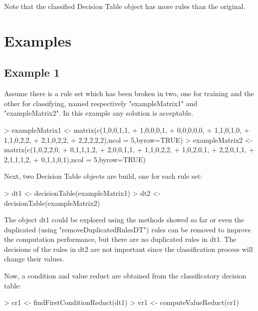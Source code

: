 \documentclass[a4paper]{article}
\begin{document}
Note that the classified Decision Table object has more rules than the original.



\section{Examples}

\subsection{Example 1}

Assume there is a rule set which has been broken in two, one for training and the other for classifying, named respectively "exampleMatrix1" and "exampleMatrix2". In this example any solution is acceptable.

\begin{Schunk}
\begin{Sinput}
> exampleMatrix1 <- matrix(c(1,0,0,1,1,
+ 1,0,0,0,1,
+ 0,0,0,0,0,
+ 1,1,0,1,0,
+ 1,1,0,2,2,
+ 2,1,0,2,2,
+ 2,2,2,2,2),ncol = 5,byrow=TRUE)
> exampleMatrix2 <- matrix(c(1,0,2,2,0,
+ 0,1,1,1,2,
+ 2,0,0,1,1,
+ 1,1,0,2,2,
+ 1,0,2,0,1,
+ 2,2,0,1,1,
+ 2,1,1,1,2,
+ 0,1,1,0,1),ncol = 5,byrow=TRUE)
\end{Sinput}
\end{Schunk}

Next, two Decision Table objects are build, one for each rule set:

\begin{Schunk}
\begin{Sinput}
> dt1 <- decisionTable(exampleMatrix1)
> dt2 <- decisionTable(exampleMatrix2)
\end{Sinput}
\end{Schunk}

The object dt1 could be explored using the methods showed so far or even the duplicated (using "removeDuplicatedRulesDT") rules can be removed to improve the computation performance, but there are no duplicated rules in dt1. The decisions of the rules in dt2 are not important since the classification process will change their values. 

Now, a condition and value reduct are obtained from the classificatory decision table:

\begin{Schunk}
\begin{Sinput}
> cr1 <- findFirstConditionReduct(dt1)
> vr1 <- computeValueReduct(cr1)
\end{Sinput}
\end{Schunk}
\end{document}

